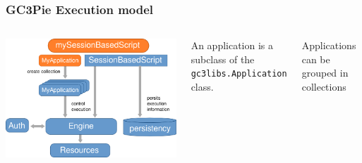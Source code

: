 \documentclass[english,serif,mathserif,xcolor=pdftex,dvipsnames,table]{beamer}
\begin{document}
\begin{frame}
  \frametitle{GC3Pie Execution model}
  \begin{columns}
      \includegraphics[width=1\textwidth]{fig/GC3Pie_execution_model}
  \begin{block}{}
    An application is a subclass of the \texttt{gc3libs.Application}
    class. \\
  \end{block}

  \begin{block}{}
    Applications can be grouped in {\color{Blue}collections}
  \end{block}
  \end{columns}
\end{frame}
\end{document}
